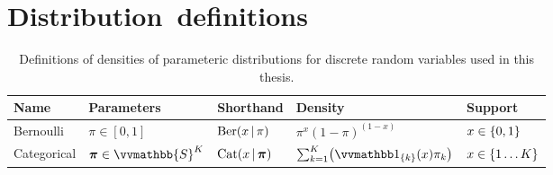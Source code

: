 \chapter{\mbox{Distribution definitions}}\label{app:distribution-definitions}


\begin{landscape}

\begin{table}[H]
\centering
\begin{tabular}{p{4cm}p{5cm}lll}
\toprule
  \textsf{Name} & \textsf{Parameters} & \textsf{Shorthand} & \textsf{Density} & Support \\
\midrule
  Bernoulli & 
  $\pi \in [0,1]$ &
  $\textrm{Ber}(x \operatorname{|} \pi)$ & 
  $\pi^x (1 -\pi)^{(1-x)}$ &
  $x \in \fset{0,1}$\\
  Categorical & 
  $\vct{\pi} \in \vvmathbb{S}^K$ &
  $\textrm{Cat}(x \operatorname{|} \boldsymbol{\pi})$ & 
  $\sum_{k=1}^K \lpa \ind{\fset{k}}(x) \pi_k \rpa$ &
  $x \in \fset{1 \dots K}$\\
\bottomrule
\end{tabular}
\caption[Standard discrete density definitions.]{Definitions of densities of parameteric distributions for discrete random variables used in this thesis.}
\label{tab:standard-distributions-discrete}
\end{table}


\end{landscape}
